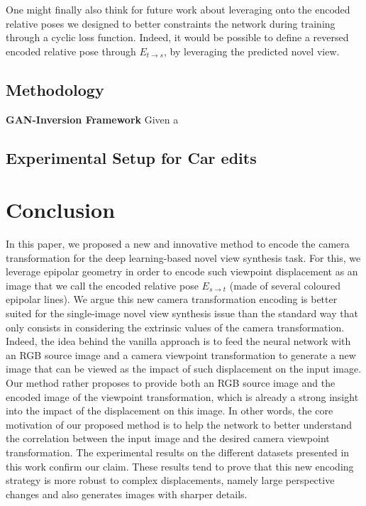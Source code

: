 One might finally also think for future work about leveraging onto the encoded relative poses we designed to better constraints the network during training through a cyclic loss function. Indeed, it would be possible to define a reversed encoded relative pose through $E_{t\xrightarrow{}s}$, by leveraging the predicted novel view. 
\subsection{Methodology}
 
\noindent \textbf{GAN-Inversion Framework} Given a 


 \subsection{Experimental Setup for Car edits}

 



\section{Conclusion}
In this paper, we proposed a new and innovative method to encode the camera transformation for the deep learning-based novel view synthesis task. For this, we leverage epipolar geometry in order to encode such viewpoint displacement as an image that we call the encoded relative pose $E_{s\xrightarrow{}t}$ (made of several coloured epipolar lines). We argue this new camera transformation encoding is better suited for the single-image novel view synthesis issue than the standard way that only consists in considering the extrinsic values of the camera transformation. Indeed, the idea behind the vanilla approach is to feed the neural network with an RGB source image and a camera viewpoint transformation to generate a new image that can be viewed as the impact of such displacement on the input image. Our method rather proposes to provide both an RGB source image and the encoded image of the viewpoint transformation, which is already a strong insight into the impact of the displacement on this image. In other words, the core motivation of our proposed method is to help the network to better understand the correlation between the input image and the desired camera viewpoint transformation. The experimental results on the different datasets presented in this work confirm our claim. These results tend to prove that this new encoding strategy is more robust to complex displacements, namely large perspective changes and also generates images with sharper details. 